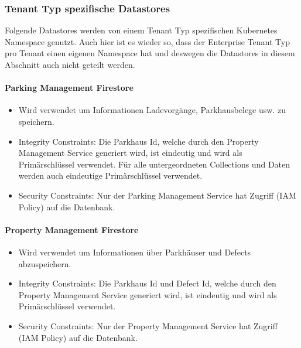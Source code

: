 \subsubsection{Tenant Typ spezifische Datastores}
Folgende Datastores werden von einem Tenant Typ spezifischen Kubernetes Namespace genutzt. Auch hier ist es wieder so, dass der Enterprise Tenant Typ pro Tenant einen eigenen Namespace hat und deswegen die Datastores in diesem Abschnitt auch nicht geteilt werden.

\paragraph{Parking Management Firestore}
\begin{itemize}
	\item Wird verwendet um Informationen Ladevorgänge, Parkhausbelege usw. zu speichern.
	\item Integrity Constraints: Die Parkhaus Id, welche durch den Property Management Service generiert wird, ist eindeutig und wird als Primärschlüssel verwendet. Für alle untergeordneten Collections und Daten werden auch eindeutige Primärschlüssel verwendet.
	\item Security Constraints: Nur der Parking Management Service hat Zugriff (IAM Policy) auf die Datenbank.
\end{itemize}

\paragraph{Property Management Firestore}
\begin{itemize}
	\item Wird verwendet um Informationen über Parkhäuser und Defects abzuspeichern.
	\item Integrity Constraints: Die Parkhaus Id und Defect Id, welche durch den Property Management Service generiert wird, ist eindeutig und wird als Primärschlüssel verwendet.
	\item Security Constraints: Nur der Property Management Service hat Zugriff (IAM Policy) auf die Datenbank.
\end{itemize}

\paragraph{}